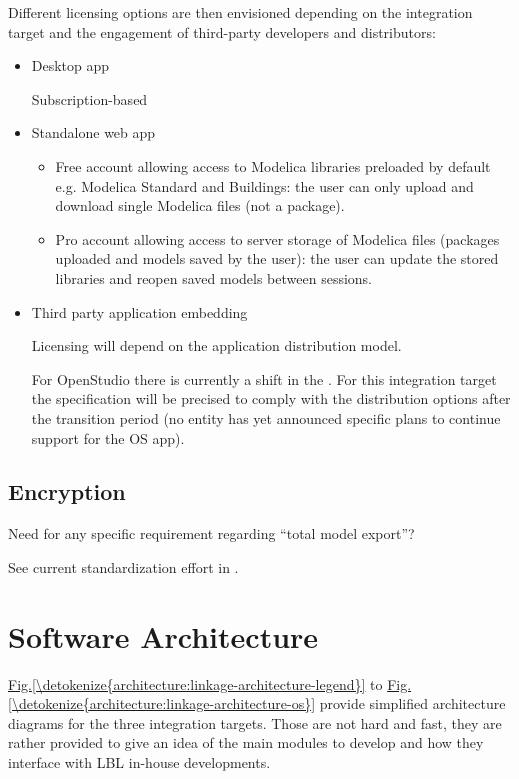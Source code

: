 \documentclass[letterpaper,10pt, openany,english]{sphinxmanual}
\begin{document}
Different licensing options are then envisioned depending on the integration target and the engagement of third-party developers and distributors:
\begin{itemize}
\item {} 
Desktop app

Subscription-based

\item {} 
Standalone web app
\begin{itemize}
\item {} 
Free account allowing access to Modelica libraries preloaded by default e.g. Modelica Standard and Buildings: the user can only upload and download single Modelica files (not a package).

\item {} 
Pro account allowing access to server storage of Modelica files (packages uploaded and models saved by the user): the user can update the stored libraries and reopen saved models between sessions.

\end{itemize}

\item {} 
Third party application embedding

Licensing will depend on the application distribution model.

For OpenStudio there is currently a shift in the . For this integration target the specification will be precised to comply with the distribution options after the transition period (no entity has yet announced specific plans to continue support for the OS app).

\end{itemize}


\section{Encryption}
\label{\detokenize{requirements:encryption}}
Need for any specific requirement regarding “total model export”?

See current standardization effort in .


\chapter{Software Architecture}
\label{\detokenize{architecture:software-architecture}}\label{\detokenize{architecture:sec-architecture}}\label{\detokenize{architecture::doc}}
\hyperref[\detokenize{architecture:linkage-architecture-legend}]{Fig.\@ \ref{\detokenize{architecture:linkage-architecture-legend}}} to \hyperref[\detokenize{architecture:linkage-architecture-os}]{Fig.\@ \ref{\detokenize{architecture:linkage-architecture-os}}} provide simplified architecture diagrams for the three integration targets.
Those are not hard and fast, they are rather provided to give an idea of the main modules to develop and how they interface with LBL in-house developments.
\end{document}
